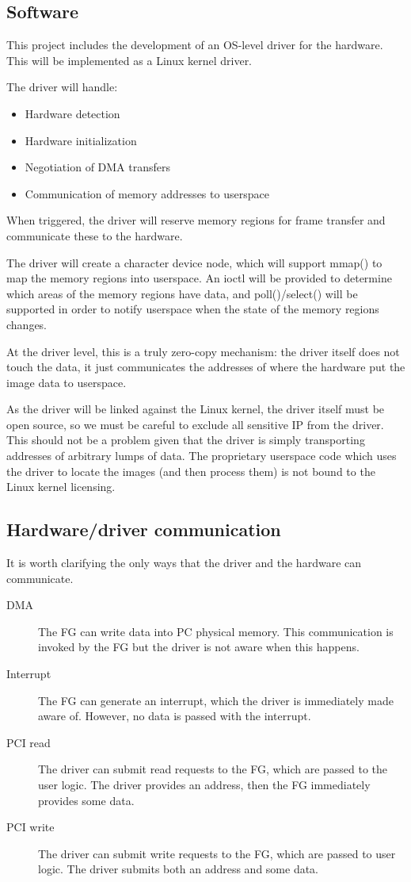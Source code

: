 \documentclass[12pt]{article}
\begin{document}
\subsection{Software}

This project includes the development of an OS-level driver for the hardware. This will be implemented as a Linux kernel driver.

The driver will handle:
\begin{itemize}
\item Hardware detection
\item Hardware initialization
\item Negotiation of DMA transfers
\item Communication of memory addresses to userspace
\end{itemize}

When triggered, the driver will reserve memory regions for frame transfer and communicate these to the hardware.

The driver will create a character device node, which will support mmap() to map the memory regions into userspace. An ioctl will be provided to determine which areas of the memory regions have data, and poll()/select() will be supported in order to notify userspace when the state of the memory regions changes.

At the driver level, this is a truly zero-copy mechanism: the driver itself does not touch the data, it just communicates the addresses of where the hardware put the image data to userspace.

As the driver will be linked against the Linux kernel, the driver itself must be open source, so we must be careful to exclude all sensitive IP from the driver. This should not be a problem given that the driver is simply transporting addresses of arbitrary lumps of data. The proprietary userspace code which uses the driver to locate the images (and then process them) is not bound to the Linux kernel licensing.

\subsection{Hardware/driver communication}

It is worth clarifying the only ways that the driver and the hardware can communicate.

\begin{description}
\item[DMA] The FG can write data into PC physical memory. This communication is invoked by the FG but the driver is not aware when this happens.
\item[Interrupt] The FG can generate an interrupt, which the driver is immediately made aware of. However, no data is passed with the interrupt.
\item[PCI read] The driver can submit read requests to the FG, which are passed to the user logic. The driver provides an address, then the FG immediately provides some data.
\item[PCI write] The driver can submit write requests to the FG, which are passed to user logic. The driver submits both an address and some data.
\end{description}
\end{document}
